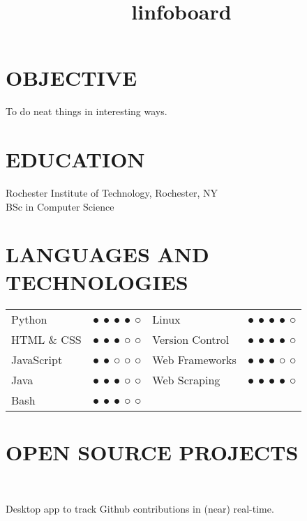\documentclass[line]{res}
\begin{document}

\begin{resume}

\section{OBJECTIVE}
    To do neat things in interesting ways.

\section{EDUCATION}
    Rochester Institute of Technology, Rochester, NY \\
    BSc in Computer Science

\section{LANGUAGES AND TECHNOLOGIES}
    \begin{tabular}{l c l c}
        Python      & ● ● ● ● ○ & Linux           & ● ● ● ● ○ \\
        HTML \& CSS & ● ● ● ○ ○ & Version Control & ● ● ● ● ○ \\
        JavaScript  & ● ● ○ ○ ○ & Web Frameworks  & ● ● ● ○ ○ \\
        Java        & ● ● ● ○ ○ & Web Scraping    & ● ● ● ● ○ \\
        Bash        & ● ● ● ○ ○ \\
    \end{tabular}

\section{OPEN SOURCE PROJECTS}
    \begin{format}
        \title{l}\\%
        \body{}
    \end{format}

    \title{infoboard}
    \begin{position}
        Desktop app to track Github contributions in (near) real-time.
    \end{position}


\end{resume}
\end{document}
